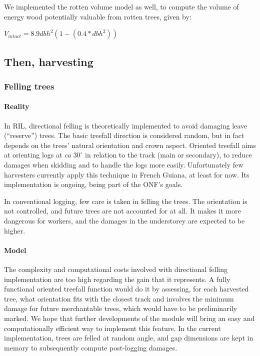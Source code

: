 \documentclass[12pt,]{article}
\theoremstyle{definition}
\theoremstyle{definition}
\theoremstyle{definition}
\theoremstyle{remark}
\begin{document}
We implemented the rotten volume model as well, to compute the volume of
energy wood potentially valuable from rotten trees, given by:

\(V_{intact} = 8.9dbh^2(1-(0.4*dbh^2))\)

\subsection{Then, harvesting}\label{then-harvesting}

\subsubsection{Felling trees}\label{felling-trees}

\paragraph{Reality}\label{reality-2}

In RIL, directional felling is theoretically implemented to avoid
damaging leave (``reserve'') trees. The basic treefall direction is
considered random, but in fact depends on the trees' natural orientation
and crown aspect. Oriented treefall aims at orienting logs at \emph{ca}
\(30^{\circ}\) in relation to the track (main or secondary), to reduce
damages when skidding and to handle the logs more easily. Unfortunately
few harvesters currently apply this technique in French Guiana, at least
for now. Its implementation is ongoing, being part of the ONF's goals.

In conventional logging, few care is taken in felling the trees. The
orientation is not controlled, and future trees are not accounted for at
all. It makes it more dangerous for workers, and the damages in the
understorey are expected to be higher.

\paragraph{Model}\label{model-3}

The complexity and computational costs involved with directional felling
implementation are too high regarding the gain that it represents. A
fully functional oriented treefall function would do it by assessing,
for each harvested tree, what orientation fits with the closest track
and involves the minimum damage for future merchantable trees, which
would have to be preliminarily marked. We hope that further developments
of the module will bring an easy and computationally efficient way to
implement this feature. In the current implementation, trees are felled
at random angle, and gap dimensions are kept in memory to subsequently
compute post-logging damages.
\end{document}
